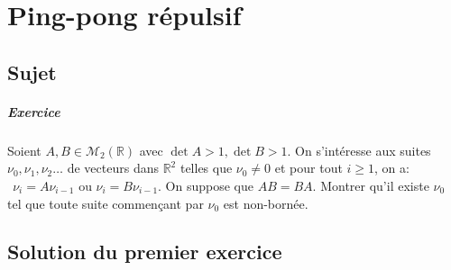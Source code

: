 \chapter{Ping-pong répulsif}

\section{Sujet}
\paragraph {Exercice}
Soient $A , B \in \mathcal M_2 (\mathbb R)$  avec $ \det A>1,\det B>1$. On s'intéresse aux suites $\nu_0,\nu_1, \nu_2 \dots$ de vecteurs dans $\mathbb R^2$ telles que $\nu_0 \neq 0$ et pour tout $i \geqslant1$, on a:   $\:\: \nu_i = A\nu_{i-1}$ ou $\nu_i = B \nu_{i-1}$.
On suppose que $AB = BA$. Montrer qu'il existe $\nu_ 0$ tel que toute suite commençant par $\nu_0$ est non-bornée.

\section{Solution du premier exercice}





